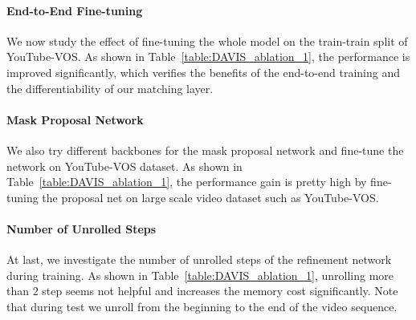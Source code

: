 \paragraph{End-to-End Fine-tuning}
We now study the effect of fine-tuning the whole model on the train-train split of YouTube-VOS.
As shown in Table~\ref{table:DAVIS_ablation_1}, the performance is improved significantly, which verifies the benefits of the end-to-end training and the differentiability of our matching layer.

\paragraph{Mask Proposal Network}
We also try different backbones for the mask proposal network and fine-tune the network on YouTube-VOS dataset. As shown in Table~\ref{table:DAVIS_ablation_1}, the performance gain is pretty high by fine-tuning the proposal net on large scale video dataset such as YouTube-VOS.


\paragraph{Number of Unrolled Steps} 
At last, we investigate the number of unrolled steps of the refinement network during training.
As shown in Table~\ref{table:DAVIS_ablation_1}, unrolling more than $2$ step seems not helpful and increases the memory cost significantly.
Note that during test we unroll from the beginning to the end of the video sequence. 
















